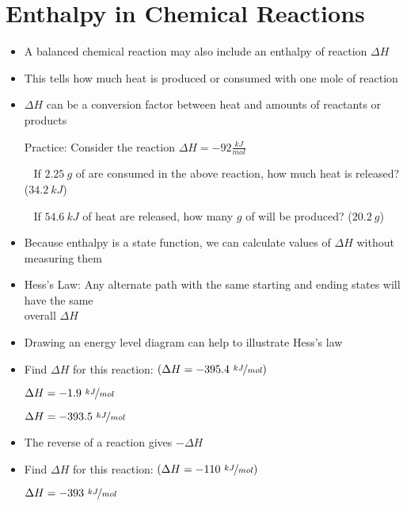 \documentclass[12pt, openany, letterpaper]{memoir}
\begin{document}
\section{Enthalpy in Chemical Reactions}
\begin{itemize}
	\item A balanced chemical reaction may also include an enthalpy of reaction $\Delta H$
	\item This tells how much heat is produced or consumed with one mole of reaction
	\item $\Delta H$ can be a conversion factor between heat and amounts of reactants or products
	
	Practice: Consider the reaction  $\Delta H = -92\frac{kJ}{mol}$
	
	~\hphantom{Practice:} If $2.25~g$ of  are consumed in the above reaction, how much heat is released? ($34.2~kJ$)
	
	~\hphantom{Practice:} If $54.6~kJ$ of heat are released, how many $g$ of  will be produced? ($20.2~g$)
	\item Because enthalpy is a state function, we can calculate values of $\Delta H$ without measuring them
	\item Hess's Law: Any alternate path with the same starting and ending states will have the same\\overall $\Delta H$
	\item Drawing an energy level diagram can help to illustrate Hess's law
	\item Find $\Delta H$ for this reaction:  \hspace{1em} $\left(\Delta H=-395.4~\nicefrac{kJ}{mol}\right)$
	
	 \hspace{2em} $\Delta H=-1.9~\nicefrac{kJ}{mol}$
	
	 \hspace{2em} $\Delta H=-393.5~\nicefrac{kJ}{mol}$
	\item The reverse of a reaction gives $-\Delta H$
	\item Find $\Delta H$ for this reaction:  \hspace{1em} $\left(\Delta H=-110~\nicefrac{kJ}{mol}\right)$
	
	 \hspace{2em} $\Delta H=-393~\nicefrac{kJ}{mol}$
	

\end{itemize}
\end{document}
